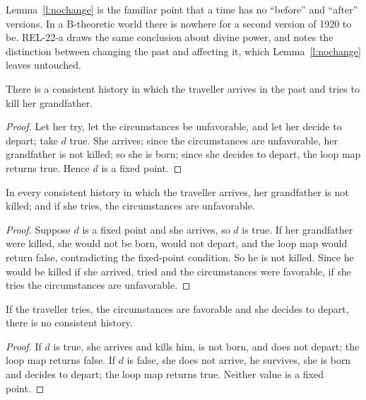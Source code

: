 \documentclass{situationist-preprint}
\begin{document}
Lemma~\ref{l:nochange} is the familiar point that a time has no \enquote{before} and \enquote{after} versions. In a B-theoretic world there is nowhere for a second version of 1920 to be. REL-22-a draws the same conclusion about divine power, and notes the distinction between changing the past and affecting it, which Lemma~\ref{l:nochange} leaves untouched.

\begin{theorem}[Consistency]\label{t:consistency}
There is a consistent history in which the traveller arrives in the past and tries to kill her grandfather.
\end{theorem}

\begin{proof}
Let her try, let the circumstances be unfavorable, and let her decide to depart; take $d$ true. She arrives; since the circumstances are unfavorable, her grandfather is not killed; so she is born; since she decides to depart, the loop map returns true. Hence $d$ is a fixed point.
\end{proof}

\begin{theorem}[Failure]\label{t:failure}
In every consistent history in which the traveller arrives, her grandfather is not killed; and if she tries, the circumstances are unfavorable.
\end{theorem}

\begin{proof}
Suppose $d$ is a fixed point and she arrives, so $d$ is true. If her grandfather were killed, she would not be born, would not depart, and the loop map would return false, contradicting the fixed-point condition. So he is not killed. Since he would be killed if she arrived, tried and the circumstances were favorable, if she tries the circumstances are unfavorable.
\end{proof}

\begin{proposition}\label{p:unrealized}
If the traveller tries, the circumstances are favorable and she decides to depart, there is no consistent history.
\end{proposition}

\begin{proof}
If $d$ is true, she arrives and kills him, is not born, and does not depart; the loop map returns false. If $d$ is false, she does not arrive, he survives, she is born and decides to depart; the loop map returns true. Neither value is a fixed point.
\end{proof}
\end{document}
